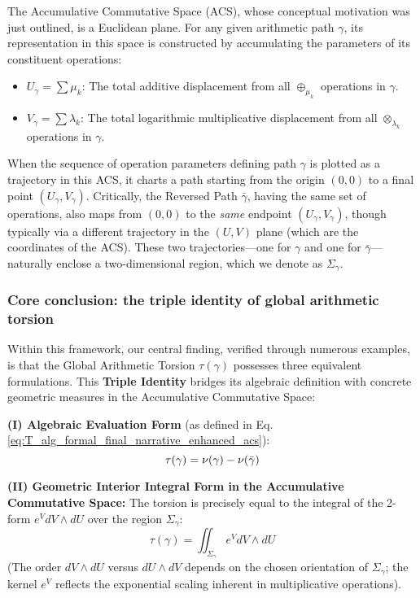 The Accumulative Commutative Space (ACS), whose conceptual motivation was just outlined, is a Euclidean plane. For any given arithmetic path $\gamma$, its representation in this space is constructed by accumulating the parameters of its constituent operations:
\begin{itemize}
    \item $U_\gamma = \sum \mu_k$: The total additive displacement from all $\oplus_{\mu_k}$ operations in $\gamma$.
    \item $V_\gamma = \sum \lambda_k$: The total logarithmic multiplicative displacement from all $\otimes_{\lambda_k}$ operations in $\gamma$.
\end{itemize}
When the sequence of operation parameters defining path $\gamma$ is plotted as a trajectory in this ACS, it charts a path starting from the origin $(0,0)$ to a final point $(U_\gamma, V_\gamma)$. Critically, the Reversed Path $\bar{\gamma}$, having the same set of operations, also maps from $(0,0)$ to the \textit{same} endpoint $(U_\gamma, V_\gamma)$, though typically via a different trajectory in the $(U,V)$ plane (which are the coordinates of the ACS). These two trajectories---one for $\gamma$ and one for $\bar{\gamma}$---naturally enclose a two-dimensional region, which we denote as $\Sigma_\gamma$.

\subsubsection*{Core conclusion: the triple identity of global arithmetic torsion}

Within this framework, our central finding, verified through numerous examples, is that the Global Arithmetic Torsion $\tau(\gamma)$ possesses three equivalent formulations. This \textbf{Triple Identity} bridges its algebraic definition with concrete geometric measures in the Accumulative Commutative Space:

\textbf{(I) Algebraic Evaluation Form} (as defined in Eq. \ref{eq:T_alg_formal_final_narrative_enhanced_acs}):
\[ \tau(\gamma) = \nu(\gamma) - \nu(\bar{\gamma}) \]

\textbf{(II) Geometric Interior Integral Form in the Accumulative Commutative Space:}
The torsion is precisely equal to the integral of the 2-form $e^V dV \wedge dU$ over the region $\Sigma_\gamma$:
\[ \tau(\gamma) = \iint_{\Sigma_\gamma} e^V dV \wedge dU \]
(The order $dV \wedge dU$ versus $dU \wedge dV$ depends on the chosen orientation of $\Sigma_\gamma$; the kernel $e^V$ reflects the exponential scaling inherent in multiplicative operations).

